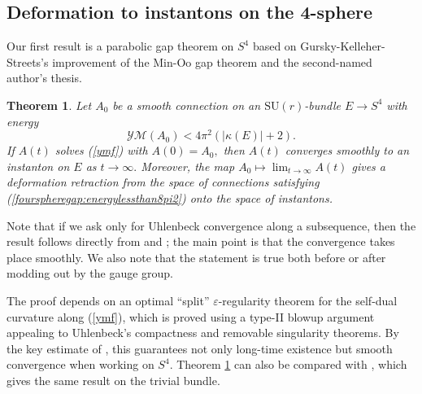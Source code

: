 \documentclass[12pt]{amsart}
\newcommand{\YM}{\mathcal{YM}}
\renewcommand{\1}{{\mathbf 1}}
\newcommand{\SU}{{\mathrm{SU} }}
\newcommand{\eps}{{\varepsilon}}
\newtheorem{thm}{Theorem}[section]
\theoremstyle{others}
\numberwithin{equation}{section}
\begin{document}
\subsection{Deformation to instantons on the 4-sphere}

Our first result is a parabolic gap theorem on $S^4$ based on Gursky-Kelleher-Streets's improvement of the Min-Oo gap theorem and the second-named author's thesis. %


\begin{thm}\label{thm:fourspheregap}
Let $A_0$ be a smooth connection on an $\SU(r)$-bundle $E \to S^4$ with energy
\begin{equation}\label{fourspheregap:energylessthan8pi2}
\YM(A_0) < 4 \pi^2 \left( |\kappa(E)|+ 2 \right).
\end{equation}
If $A(t)$ solves (\ref{ymf}) with $A(0) = A_0,$ then $A(t)$ converges smoothly to an instanton on $E$ as $t \to \infty.$ Moreover, the map $A_0 \mapsto \lim_{t \to \infty} A(t)$ gives a deformation retraction from the space of connections satisfying (\ref{fourspheregap:energylessthan8pi2}) onto the space of instantons. %
\end{thm}

Note that if we ask only for Uhlenbeck convergence along a subsequence, %
then the result follows directly from \cite{gurskykelleherstreets} and \cite{lte}; %
the main point is that the convergence takes place smoothly. %
We also note that the statement is true both before or after modding out by the gauge group.

The proof depends on an optimal ``split'' $\eps$-regularity theorem for the self-dual curvature along (\ref{ymf}), which is proved using a type-II blowup argument appealing to Uhlenbeck's compactness and removable singularity theorems. %
By the key estimate of \cite{instantons}, this guarantees not only long-time existence but smooth convergence when working %
on $S^4.$
Theorem \ref{thm:fourspheregap} can also be compared with \cite[Theorem 1.3]{gurskykelleherstreets}, which gives the same result on the trivial bundle. %
\end{document}
